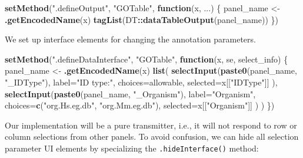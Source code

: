 \documentclass[
]{book}
\newenvironment{Shaded}{\begin{snugshade}}{\end{snugshade}}
\newcommand{\ControlFlowTok}[1]{\textcolor[rgb]{0.13,0.29,0.53}{\textbf{#1}}}
\newcommand{\DataTypeTok}[1]{\textcolor[rgb]{0.13,0.29,0.53}{#1}}
\newcommand{\KeywordTok}[1]{\textcolor[rgb]{0.13,0.29,0.53}{\textbf{#1}}}
\newcommand{\NormalTok}[1]{#1}
\newcommand{\OperatorTok}[1]{\textcolor[rgb]{0.81,0.36,0.00}{\textbf{#1}}}
\newcommand{\OtherTok}[1]{\textcolor[rgb]{0.56,0.35,0.01}{#1}}
\newcommand{\StringTok}[1]{\textcolor[rgb]{0.31,0.60,0.02}{#1}}
\begin{document}
\begin{Shaded}
\begin{Highlighting}[]
\KeywordTok{setMethod}\NormalTok{(}\StringTok{".defineOutput"}\NormalTok{, }\StringTok{"GOTable"}\NormalTok{, }\ControlFlowTok{function}\NormalTok{(x, ...) \{}
\NormalTok{    panel_name <-}\StringTok{ }\KeywordTok{.getEncodedName}\NormalTok{(x)}
    \KeywordTok{tagList}\NormalTok{(DT}\OperatorTok{::}\KeywordTok{dataTableOutput}\NormalTok{(panel_name))}
\NormalTok{\})}
\end{Highlighting}
\end{Shaded}

We set up interface elements for changing the annotation parameters.

\begin{Shaded}
\begin{Highlighting}[]
\KeywordTok{setMethod}\NormalTok{(}\StringTok{".defineDataInterface"}\NormalTok{, }\StringTok{"GOTable"}\NormalTok{, }\ControlFlowTok{function}\NormalTok{(x, se, select_info) \{}
\NormalTok{    panel_name <-}\StringTok{ }\KeywordTok{.getEncodedName}\NormalTok{(x)}
    \KeywordTok{list}\NormalTok{(}
        \KeywordTok{selectInput}\NormalTok{(}\KeywordTok{paste0}\NormalTok{(panel_name, }\StringTok{"_IDType"}\NormalTok{),}
            \DataTypeTok{label=}\StringTok{"ID type:"}\NormalTok{,}
            \DataTypeTok{choices=}\NormalTok{allowable,}
            \DataTypeTok{selected=}\NormalTok{x[[}\StringTok{"IDType"}\NormalTok{]]}
\NormalTok{        ),}
        \KeywordTok{selectInput}\NormalTok{(}\KeywordTok{paste0}\NormalTok{(panel_name, }\StringTok{"_Organism"}\NormalTok{),}
            \DataTypeTok{label=}\StringTok{"Organism"}\NormalTok{,}
            \DataTypeTok{choices=}\KeywordTok{c}\NormalTok{(}\StringTok{"org.Hs.eg.db"}\NormalTok{, }\StringTok{"org.Mm.eg.db"}\NormalTok{),}
            \DataTypeTok{selected=}\NormalTok{x[[}\StringTok{"Organism"}\NormalTok{]]}
\NormalTok{        )}
\NormalTok{    )}
\NormalTok{\})}
\end{Highlighting}
\end{Shaded}

Our implementation will be a pure transmitter, i.e., it will not respond to row or column selections from other panels.
To avoid confusion, we can hide all selection parameter UI elements by specializing the \texttt{.hideInterface()} method:

\begin{Shaded}
\end{Shaded}
\end{document}
